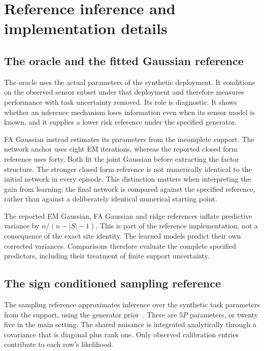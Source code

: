 \section{Reference inference and implementation details}
\label{app:reference}

\subsection{The oracle and the fitted Gaussian reference}

The oracle uses the actual parameters of the synthetic deployment. It conditions on the observed sensor subset under that deployment and therefore measures performance with task uncertainty removed. Its role is diagnostic. It shows whether an inference mechanism loses information even when its sensor model is known, and it supplies a lower risk reference under the specified generator.

FA Gaussian instead estimates its parameters from the incomplete support. The network anchor uses eight EM iterations, whereas the reported closed form reference uses forty. Both fit the joint Gaussian before extracting the factor structure. The stronger closed form reference is not numerically identical to the initial network in every episode. This distinction matters when interpreting the gain from learning: the final network is compared against the specified reference, rather than against a deliberately identical numerical starting point.

The reported EM Gaussian, FA Gaussian and ridge references inflate predictive variance by \(n/(n-|S|-1)\). This is part of the reference implementation, not a consequence of the exact site identity. The learned models predict their own corrected variances. Comparisons therefore evaluate the complete specified predictors, including their treatment of finite support uncertainty.

\subsection{The sign conditioned sampling reference}

The sampling reference approximates inference over the synthetic task parameters from the support, using the generator prior~\citep{neal2011hmc}. There are \(5P\) parameters, or twenty five in the main setting. The shared nuisance is integrated analytically through a covariance that is diagonal plus rank one. Only observed calibration entries contribute to each row's likelihood.

